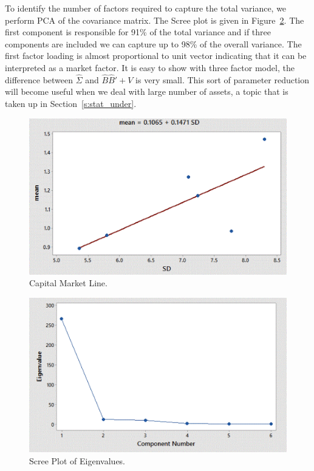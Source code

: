 To identify the number of factors required to capture the total variance, we perform PCA of the covariance matrix. The Scree plot is given in Figure~\ref{fig:screeplot}. The first component is responsible for 91\% of the total variance and if three components are included we can capture up to 98\% of the overall variance. The first factor loading is almost proportional to unit vector indicating that it can be interpreted as a market factor. It is easy to show with three factor model, the difference between $\hat{\Sigma}$ and $\hat{B}\hat{B}'+V$ is very small. This sort of parameter reduction will become useful when we deal with large number of assets, a topic that is taken up in Section~\ref{s:stat_under}.

        \begin{figure}[!ht]
        \centering
        \includegraphics[width=\textwidth]{chapters/chapter_apm/figures/capmarket.png} 
        \caption{Capital Market Line.\label{fig:capmarket}}
        \end{figure}


        \begin{figure}[!ht]
        \centering
        \includegraphics[width=\textwidth]{chapters/chapter_apm/figures/scree.png} 
        \caption{Scree Plot of Eigenvalues.\label{fig:screeplot}}
        \end{figure}


